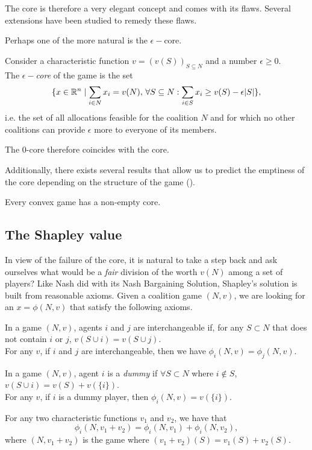 The core is therefore a very elegant concept and comes with its flaws. Several extensions have been studied to remedy these flaws.

Perhaps one of the more natural is the $\epsilon-$core.
\begin{definition}
Consider a characteristic function $v = (v(S))_{S \subseteq N}$ and a number $\epsilon \geq 0$.\\
The $\epsilon-$\emph{core} of the game is the set
$$ \{x \in \mathbb{R}^n \mid \sum_{i \in N} x_i = v(N), \, \forall S \subseteq N:  \sum_{i \in S} x_i \geq v(S) - \epsilon|S|\}, $$
i.e. the set of all allocations feasible for the coalition $N$ and for which no other coalitions can provide $\epsilon$ more to everyone of its members.
\end{definition}
The $0$-core therefore coincides with the core.

Additionally, there exists several results that allow us to predict the emptiness of the core depending on the structure of the game (\cite[Section 12.2]{ShLeMSAG}).
\begin{theorem}
Every convex game has a non-empty core.
\end{theorem}


\subsection{The Shapley value}

In view of the failure of the core, it is natural to take a step back and ask ourselves what would be a \emph{fair} division of the worth $v(N)$ among a set of players?
Like Nash did with its Nash Bargaining Solution, Shapley's solution is built from reasonable axioms.
Given a coalition game $(N,v)$, we are looking for an $x = \phi(N,v)$ that satisfy the following axioms.
\begin{axiom}[Symmetry]
In a game $(N,v)$, agents $i$ and $j$ are interchangeable if, for any $S \subset N$ that does not contain $i$ or $j$, $v(S \cup i ) = v(S \cup j).$\\
For any $v$, if $i$ and $j$ are interchangeable, then we have $\phi_i(N,v) = \phi_j(N,v).$
\end{axiom}
\begin{axiom}[Support]
In a game $(N,v)$, agent $i$ is a \emph{dummy} if $\forall S \subset N$ where $i \not \in S$, $v(S \cup i) = v(S) + v(\{i\})$.\\
For any $v$, if $i$ is a dummy player, then $\phi_i(N,v) = v(\{i\}).$
\end{axiom}
\begin{axiom}[Additivity]
For any two characteristic functions $v_1$ and $v_2$, we have that
$$ \phi_{i}(N, v_1 + v_2) = \phi_{i}(N,v_1) + \phi_i(N, v_2), $$
where $(N, v_1+v_2)$ is the game where $(v_1 + v_2)(S) = v_1(S) + v_2(S).$
\end{axiom}


